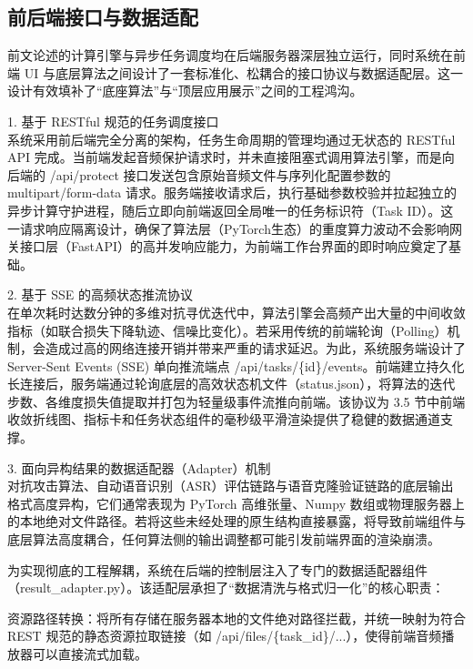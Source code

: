 \subsection{前后端接口与数据适配}\label{ux524dux540eux7aefux63a5ux53e3ux534fux8baeux4e0eux6570ux636eux9002ux914dux8bbeux8ba1}

前文论述的计算引擎与异步任务调度均在后端服务器深层独立运行，同时系统在前端
UI
与底层算法之间设计了一套标准化、松耦合的接口协议与数据适配层。这一设计有效填补了``底座算法''与``顶层应用展示''之间的工程鸿沟。

1. 基于 RESTful 规范的任务调度接口\\
系统采用前后端完全分离的架构，任务生命周期的管理均通过无状态的 RESTful
API
完成。当前端发起音频保护请求时，并未直接阻塞式调用算法引擎，而是向后端的
/api/protect 接口发送包含原始音频文件与序列化配置参数的
multipart/form-data
请求。服务端接收请求后，执行基础参数校验并拉起独立的异步计算守护进程，随后立即向前端返回全局唯一的任务标识符（Task
ID）。这一请求响应隔离设计，确保了算法层（PyTorch生态）的重度算力波动不会影响网关接口层（FastAPI）的高并发响应能力，为前端工作台界面的即时响应奠定了基础。

2. 基于 SSE 的高频状态推流协议\\
在单次耗时达数分钟的多维对抗寻优迭代中，算法引擎会高频产出大量的中间收敛指标（如联合损失下降轨迹、信噪比变化）。若采用传统的前端轮询（Polling）机制，会造成过高的网络连接开销并带来严重的请求延迟。为此，系统服务端设计了
Server-Sent Events (SSE) 单向推流端点
/api/tasks/\{id\}/events。前端建立持久化长连接后，服务端通过轮询底层的高效状态机文件（status.json），将算法的迭代步数、各维度损失值提取并打包为轻量级事件流推向前端。该协议为
3.5
节中前端收敛折线图、指标卡和任务状态组件的毫秒级平滑渲染提供了稳健的数据通道支撑。

3. 面向异构结果的数据适配器（Adapter）机制\\
对抗攻击算法、自动语音识别（ASR）评估链路与语音克隆验证链路的底层输出格式高度异构，它们通常表现为
PyTorch 高维张量、Numpy
数组或物理服务器上的本地绝对文件路径。若将这些未经处理的原生结构直接暴露，将导致前端组件与底层算法高度耦合，任何算法侧的输出调整都可能引发前端界面的渲染崩溃。

为实现彻底的工程解耦，系统在后端的控制层注入了专门的数据适配器组件（result\_adapter.py）。该适配层承担了``数据清洗与格式归一化''的核心职责：

资源路径转换：将所有存储在服务器本地的文件绝对路径拦截，并统一映射为符合
REST 规范的静态资源拉取链接（如
/api/files/\{task\_id\}/...），使得前端音频播放器可以直接流式加载。

